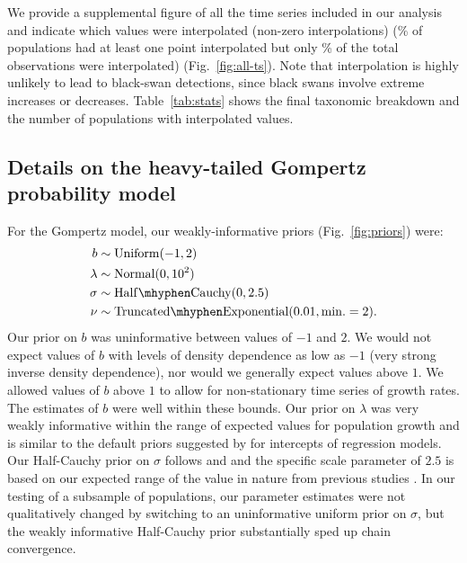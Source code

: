 \noindent
We provide a supplemental figure of all the time series included in our
analysis and indicate which values were interpolated (non-zero interpolations)
(\percImputedPops\% of populations had at least one point interpolated but
only \percImputedPoints\% of the total observations were interpolated)
(Fig.~\ref{fig:all-ts}). Note that interpolation is highly unlikely to lead to
black-swan detections, since black swans involve extreme increases or
decreases. Table~\ref{tab:stats} shows the final taxonomic breakdown and the
number of populations with interpolated values.

\subsection{Details on the heavy-tailed Gompertz probability model}

For the Gompertz model, our weakly-informative priors (Fig.~\ref{fig:priors})
were:
\begin{align*}
b &\sim \mathrm{Uniform}(-1, 2)\\ \lambda &\sim \mathrm{Normal}(0, 10^2)\\
\sigma &\sim \mathrm{Half\mhyphen Cauchy} (0, 2.5)\\ \nu &\sim
\mathrm{Truncated\mhyphen Exponential}(0.01, \mathrm{min.} = 2).
\end{align*}
Our prior on $b$ was uninformative between values of $-1$ and $2$. We would
not expect values of $b$ with levels of density dependence as low as $-1$
(very strong inverse density dependence), nor would we generally expect values
above $1$. We allowed values of $b$ above $1$ to allow for non-stationary time
series of growth rates. The estimates of $b$ were well within these bounds.
Our prior on $\lambda$ was very weakly informative within the range of
expected values for population growth and is similar to the default priors
suggested by \citet{gelman2008d} for intercepts of regression models. Our
Half-Cauchy prior on $\sigma$ follows \citet{gelman2006c} and
\citet{gelman2008d} and the specific scale parameter of $2.5$ is based on our
expected range of the value in nature from previous studies
\citep[e.g.][]{connors2014}. In our testing of a subsample of populations, our
parameter estimates were not qualitatively changed by switching to an
uninformative uniform prior on $\sigma$, but the weakly informative
Half-Cauchy prior substantially sped up chain convergence.

